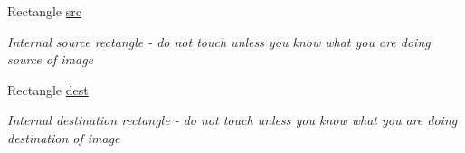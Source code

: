 \begin{DoxyCompactItemize}
Rectangle \mbox{\hyperlink{class_r_c___framework_1_1_sprite3_aec76c65582a5d71056a0d5f44f2e2906}{src}}
\begin{DoxyCompactList}\small\item\em Internal source rectangle -\/ do not touch unless you know what you are doing source of image \end{DoxyCompactList}\item 
Rectangle \mbox{\hyperlink{class_r_c___framework_1_1_sprite3_ab2d852bf859c3d55bcf6517797b69dc6}{dest}}
\begin{DoxyCompactList}\small\item\em Internal destination rectangle -\/ do not touch unless you know what you are doing destination of image \end{DoxyCompactList}\end{DoxyCompactItemize}
